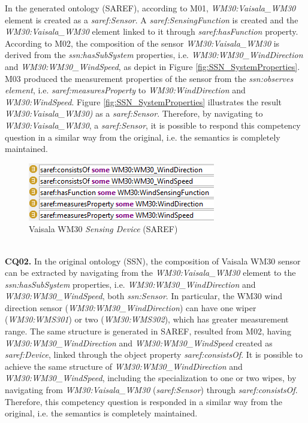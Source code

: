 \documentclass{sig-alternate-05-2015}
\begin{document}
In the generated ontology (SAREF), according to M01, \textit{WM30:\-Vaisala\-\_WM30} element is created as a \textit{saref:\-Sensor}. A \textit{saref:\-SensingFunction} is created and the \textit{WM30:\-Vaisala\-\_WM30} element linked to it through \textit{saref:\-hasFunction} property. According to M02, the composition of the sensor \textit{WM30:\-Vaisala\-\_WM30} is derived from the \textit{ssn:\-hasSubSystem} properties, i.e. \textit{WM30:\-WM30\-\_Wind\-Direction} and \textit{WM30:\-WM30\-\_WindSpeed}, as depict in Figure \ref{fig:SSN_SystemProperties}. M03 produced the measurement properties of the sensor from the \textit{ssn:\-observes element}, i.e. \textit{saref:\-measuresProperty} to \textit{WM30:\-WindDirection} and \textit{WM30:\-WindSpeed}. Figure \ref{fig:SSN_SystemProperties} illustrates the result \textit{WM30:\-Vaisala\-\_WM30)} as a \textit{saref:\-Sensor}. Therefore, by navigating to \textit{WM30:\-Vaisala\-\_WM30}, a \textit{saref:\-Sensor}, it is possible to respond this competency question in a similar way from the original, i.e. the semantics is completely maintained.  
\begin{figure}[h!]
\centering
\includegraphics[scale=0.98]{SAREF_Sensor_WM30}
\caption{Vaisala WM30 \textit{Sensing Device} (SAREF)}
\label{fig:SAREF_Sensor_WM30}
\end{figure}
\\\textbf{CQ02.} In the original ontology (SSN), the composition of Vaisala WM30 sensor can be extracted by navigating from the \textit{WM30:\-Vaisala\-\_WM30} element to the \textit{ssn:\-hasSubSystem} properties, i.e. \textit{WM30:\-WM30\-\_Wind\-Direction} and \textit{WM30:\-WM30\-\_WindSpeed}, both \textit{ssn:\-Sensor}. In particular, the WM30 wind direction sensor (\textit{WM30:\-WM30\-\_Wind\-Direction}) can have one wiper (\textit{WM30:\-WMS301}) or two (\textit{WM30:\-WMS302}), which has greater measurement range. The same structure is generated in SAREF, resulted from M02, having \textit{WM30:\-WM30\-\_Wind\-Direction} and \textit{WM30:\-WM30\-\_WindSpeed} created as \textit{saref:\-Device}, linked through the object property \textit{saref:\-consistsOf}. It is possible to achieve the same structure of \textit{WM30:\-WM30\-\_Wind\-Direction} and \textit{WM30:\-WM30\-\_WindSpeed}, including the specialization to one or two wipes, by navigating from \textit{WM30:\-Vaisala\-\_WM30} (\textit{saref:\-Sensor}) through \textit{saref:\-consistsOf}. Therefore, this competency question is responded in a similar way from the original, i.e. the semantics is completely maintained.
\end{document}

